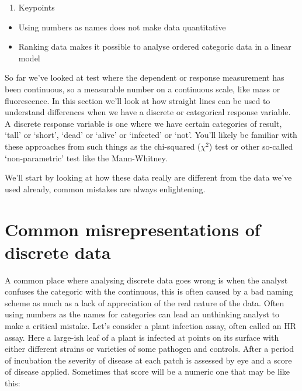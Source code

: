 \documentclass[
]{book}
\providecommand{\tightlist}{%
  \setlength{\itemsep}{0pt}\setlength{\parskip}{0pt}}
\begin{document}
\begin{enumerate}
\def\labelenumi{\arabic{enumi}.}
\setcounter{enumi}{2}
\tightlist
\item
  Keypoints
\end{enumerate}

\begin{itemize}
\tightlist
\item
  Using numbers as names does not make data quantitative
\item
  Ranking data makes it possible to analyse ordered categoric data in a linear model
\end{itemize}

So far we've looked at test where the dependent or response measurement has been continuous, so a measurable number on a continuous scale, like mass or fluorescence. In this section we'll look at how straight lines can be used to understand differences when we have a discrete or categorical response variable. A discrete response variable is one where we have certain categories of result, `tall' or `short', `dead' or `alive' or `infected' or `not'. You'll likely be familiar with these approaches from such things as the chi-squared (\(\chi^2\)) test or other so-called `non-parametric' test like the Mann-Whitney.

We'll start by looking at how these data really are different from the data we've used already, common mistakes are always enlightening.

\hypertarget{common-misrepresentations-of-discrete-data}{%
\section{Common misrepresentations of discrete data}\label{common-misrepresentations-of-discrete-data}}

A common place where analysing discrete data goes wrong is when the analyst confuses the categoric with the continuous, this is often caused by a bad naming scheme as much as a lack of appreciation of the real nature of the data. Often using numbers as the names for categories can lead an unthinking analyst to make a critical mistake. Let's consider a plant infection assay, often called an HR assay. Here a large-ish leaf of a plant is infected at points on its surface with either different strains or varieties of some pathogen and controls. After a period of incubation the severity of disease at each patch is assessed by eye and a score of disease applied. Sometimes that score will be a numeric one that may be like this:
\end{document}
